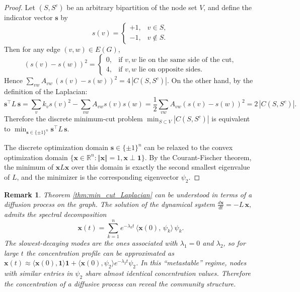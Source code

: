 \documentclass[reprint,onecolumn]{article}
\newtheorem{remark}[theorem]{Remark}
\newcommand{\R}{\mathbb{R}}
\newcommand{\1}{\mathbb{1}}
\newcommand{\0}{\mathbf{0}}
\begin{document}
\begin{proof}
Let $(S,S^c)$ be an arbitrary bipartition of the node set $V$, and define the indicator vector \(\mathbf{s}\) by
\[
s(v) = 
\begin{cases}
+1,&v\in S,\\
-1,&v\notin S.
\end{cases}
\]
Then for any edge \((v,w)\in E(G)\),  
\[
(s(v) - s(w))^2
=\begin{cases}
0,&\text{if \(v,w\) lie on the same side of the cut},\\
4,&\text{if \(v,w\) lie on opposite sides}.
\end{cases}
\]
Hence
\(
\sum_{vw}A_{vw}\,(s(v) - s(w))^2
=4\,|C(S,S^c)|.
\) On the other hand, by the definition of the Laplacian:
\[
\mathbf{s}^\top L\,\mathbf{s} = \sum_{v}k_{v}s(v)^2 - \sum_{vw}A_{vw}s(v)s(w)
=\frac1{2}\sum_{vw}A_{vw}(s(v) - s(w))^2
=2\,|C(S,S^c)|.
\]
Therefore the discrete minimum-cut problem
\(
\min_{S\subset V}|C(S,S^c)|
\)  is equivalent to \(
\min_{\mathbf{s}\in\{\pm1\}^n}
\mathbf{s}^\top L\,\mathbf{s}.
\)

The discrete optimization domain \(\mathbf{s}\in\{\pm1\}^n\) can be relaxed to the convex optimization domain $\{\mathbf{x}\in\R^n:\Vert\mathbf{x}\Vert=1,\mathbf{x}\perp\mathbf{1}\}$. By the Courant-Fischer theorem, the minimum of \(\mathbf{x}L\mathbf{x}\) over this domain is exactly the second smallest eigenvalue of \(L\), and the minimizer is the corresponding eigenvector \(\psi_2\). 
\end{proof}

\begin{remark}  \label{rem:diffusion}
Theorem \ref{thm:min_cut_Laplacian} can be understood in terms of a diffusion process on the graph. The solution of the dynamical system
\(
\frac{d\mathbf{x}}{dt} = -L\,\mathbf{x},
\)
admits the spectral decomposition
\[
\mathbf{x}(t)
=\sum_{k=1}^n e^{-\lambda_k t}\,\langle \mathbf{x}(0),\,\psi_k\rangle\,\psi_k.
\]
The slowest-decaying modes are the ones associated with $\lambda_1=0$ and \(\lambda_2\), so for large \(t\) the concentration profile can be approximated as 
\(\mathbf{x}(t)\approx \langle \mathbf{x}(0),\mathbf{1}\rangle \mathbf{1} + \langle \mathbf{x}(0),\psi_2\rangle e^{-\lambda_2 t}\psi_2\).  In this ``metastable'' regime, nodes with similar entries in \(\psi_2\) share almost identical concentration values. Therefore the concentration of a diffusive process can reveal the community structure.
\end{remark}
%
\end{document}

